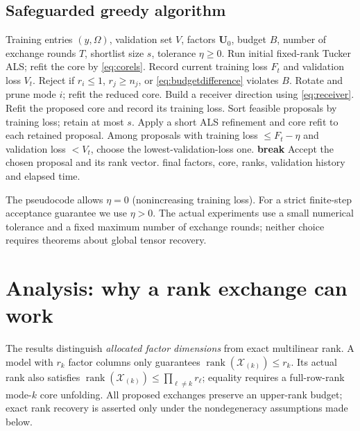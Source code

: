 \documentclass[review,10pt]{elsarticle}
\newcommand{\cX}{\mathcal X}
\newcommand{\Om}{\Omega}
\begin{document}
\subsection{Safeguarded greedy algorithm}\label{subsec:algorithm}
\begin{algorithm}[tbp]
\caption{PATT: budget-aware greedy Tucker rank exchange}\label{alg:patt}
\begin{algorithmic}[1]
\Require Training entries $(y,\Om)$, validation set $V$, factors $\boldsymbol U_0$, budget $B$, number of exchange rounds $T$, shortlist size $s$, tolerance $\eta\ge0$.
\State Run initial fixed-rank Tucker ALS; refit the core by \eqref{eq:corels}.
 \State Record current training loss $F_t$ and validation loss $V_t$.
  \State Reject if $r_i\le1$, $r_j\ge n_j$, or \eqref{eq:budgetdifference} violates $B$.
  \State Rotate and prune mode $i$; refit the reduced core.
  \State Build a receiver direction using \eqref{eq:receiver}.
  \State Refit the proposed core and record its training loss.
 \EndFor
 \State Sort feasible proposals by training loss; retain at most $s$.
 \State Apply a short ALS refinement and core refit to each retained proposal.
 \State Among proposals with training loss $\le F_t-\eta$ and validation loss $<V_t$, choose the lowest-validation-loss one.
  \State \textbf{break}
 \EndIf
 \State Accept the chosen proposal and its rank vector.
\EndFor
\State \Return final factors, core, ranks, validation history and elapsed time.
\end{algorithmic}
\end{algorithm}

The pseudocode allows $\eta=0$ (nonincreasing training loss). For a strict finite-step acceptance guarantee we use $\eta>0$. The actual experiments use a small numerical tolerance and a fixed maximum number of exchange rounds; neither choice requires theorems about global tensor recovery.

\section{Analysis: why a rank exchange can work}\label{sec:analysis}
The results distinguish \emph{allocated factor dimensions} from exact multilinear rank. A model with $r_k$ factor columns only guarantees $\operatorname{rank}(\cX_{(k)})\leq r_k$. Its actual rank also satisfies $\operatorname{rank}(\cX_{(k)})\leq\prod_{\ell\ne k}r_\ell$; equality requires a full-row-rank mode-$k$ core unfolding. All proposed exchanges preserve an upper-rank budget; exact rank recovery is asserted only under the nondegeneracy assumptions made below.
\end{document}

